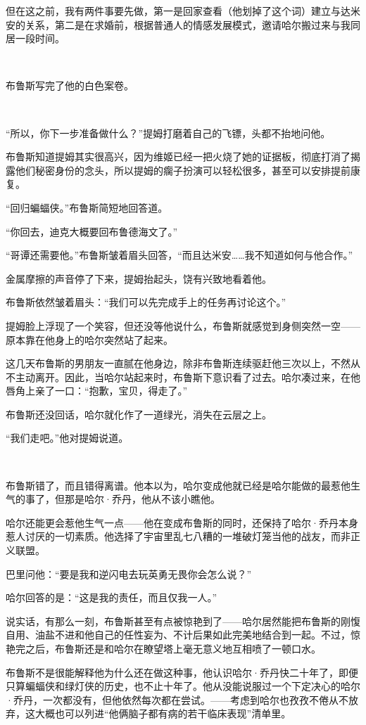\documentclass[../main]{subfiles}
\begin{document}
但在这之前，我有两件事要先做，第一是回家查看（他划掉了这个词）建立与达米安的关系，第二是在求婚前，根据普通人的情感发展模式，邀请哈尔搬过来与我同居一段时间。

~\

布鲁斯写完了他的白色案卷。

~\

“所以，你下一步准备做什么？”提姆打磨着自己的飞镖，头都不抬地问他。

布鲁斯知道提姆其实很高兴，因为维姬已经一把火烧了她的证据板，彻底打消了揭露他们秘密身份的念头，所以提姆的瘸子扮演可以轻松很多，甚至可以安排提前康复。

“回归蝙蝠侠。”布鲁斯简短地回答道。

“你回去，迪克大概要回布鲁德海文了。”

“哥谭还需要他。”布鲁斯皱着眉头回答，“而且达米安……我不知道如何与他合作。”

金属摩擦的声音停了下来，提姆抬起头，饶有兴致地看着他。

布鲁斯依然皱着眉头：“我们可以先完成手上的任务再讨论这个。”

提姆脸上浮现了一个笑容，但还没等他说什么，布鲁斯就感觉到身侧突然一空——原本靠在他身上的哈尔突然站了起来。

这几天布鲁斯的男朋友一直腻在他身边，除非布鲁斯连续驱赶他三次以上，不然从不主动离开。因此，当哈尔站起来时，布鲁斯下意识看了过去。哈尔凑过来，在他唇角上亲了一口：“抱歉，宝贝，得走了。”

布鲁斯还没回话，哈尔就化作了一道绿光，消失在云层之上。

“我们走吧。”他对提姆说道。

~\

布鲁斯错了，而且错得离谱。他本以为，哈尔变成他就已经是哈尔能做的最惹他生气的事了，但那是哈尔·乔丹，他从不该小瞧他。

哈尔还能更会惹他生气一点——他在变成布鲁斯的同时，还保持了哈尔·乔丹本身惹人讨厌的一切素质。他选择了宇宙里乱七八糟的一堆破灯笼当他的战友，而非正义联盟。

巴里问他：“要是我和逆闪电去玩英勇无畏你会怎么说？”

哈尔回答的是：“这是我的责任，而且仅我一人。”

说实话，有那么一刻，布鲁斯甚至有点被惊艳到了——哈尔居然能把布鲁斯的刚愎自用、油盐不进和他自己的任性妄为、不计后果如此完美地结合到一起。不过，惊艳完之后，布鲁斯还是和哈尔在瞭望塔上毫无意义地互相喷了一顿口水。

布鲁斯不是很能解释他为什么还在做这种事，他认识哈尔·乔丹快二十年了，即便只算蝙蝠侠和绿灯侠的历史，也不止十年了。他从没能说服过一个下定决心的哈尔·乔丹，一次都没有，但他依然每次都在尝试。——考虑到哈尔也孜孜不倦从不放弃，这大概也可以列进“他俩脑子都有病的若干临床表现”清单里。
\end{document}
